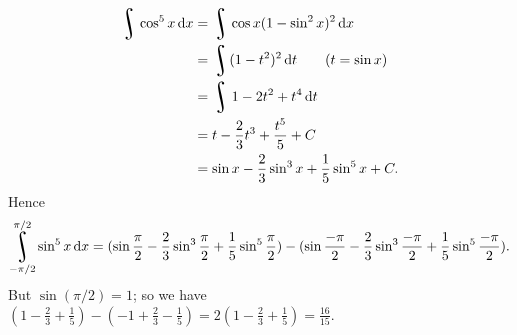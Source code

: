 \begin{enumerate}
        \begin{align*}
          \rint \cos^5 x \dif{x} &= \rint \cos x (1 - \sin^2 x)^2 \dif{x}\\
                                 &= \rint (1 - t^2)^2 \dif{t} \qquad\text{($ t = \sin x $)}\\
                                 &= \rint 1 - 2t^2 + t^4 \dif{t}\\
                                 &= t - \frac{2}{3}t^3 + \frac{t^5}{5} + C\\
                                 &= \sin x - \frac{2}{3} \sin^3 x + \frac{1}{5} \sin^5 x + C.
        \end{align*}
        Hence
        \begin{displaymath}
          \rint^{\pi/2}_{-\pi/2} \sin^5 x \dif{x} = (\sin \frac{\pi}{2} - \frac{2}{3} \sin^3 \frac{\pi}{2} + \frac{1}{5} \sin^5 \frac{\pi}{2}) - (\sin \frac{-\pi}{2} - \frac{2}{3} \sin^3 \frac{-\pi}{2} + \frac{1}{5} \sin^5 \frac{-\pi}{2}).
        \end{displaymath}
        But $ \sin (\pi/2) = 1 $; so we have $ (1 - \frac{2}{3} + \frac{1}{5}) - (-1 + \frac{2}{3} - \frac{1}{5}) = 2(1 - \frac{2}{3} + \frac{1}{5}) = \frac{16}{15} $.
\end{enumerate}


